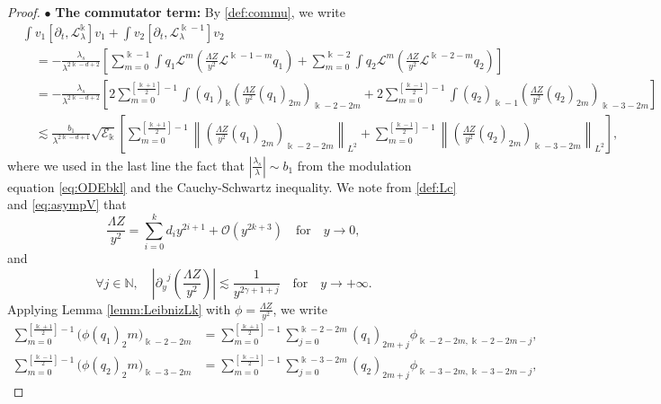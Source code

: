 \documentclass[11pt]{aims}
\theoremstyle{definition}
\numberwithin{equation}{section}
\begin{document}
\begin{proof}
\noindent $\bullet$ \textbf{The commutator term:} By \eqref{def:commu}, we write 
\begin{align*}
&\int v_1 [{\partial_t}, {\mathscr{L}}_\lambda^\Bbbk]v_1 + \int v_2 [{\partial_t}, {\mathscr{L}}_\lambda^{\Bbbk-1}]v_2 \\
&\quad = -\frac{\lambda_s}{\lambda^{2\Bbbk - d + 2}}\left[ \sum_{m = 0}^{\Bbbk - 1}\int q_1 {\mathscr{L}}^m \left(\frac{\Lambda Z}{y^2}{\mathscr{L}}^{\Bbbk - 1 - m}q_1 \right) +\sum_{m = 0}^{\Bbbk - 2}\int q_2 {\mathscr{L}}^m \left(\frac{\Lambda Z}{y^2}{\mathscr{L}}^{\Bbbk - 2 - m}q_2 \right)\right]\\
& \quad = -\frac{\lambda_s}{\lambda^{2\Bbbk - d + 2}} \left[ 2\sum_{m = 0}^{\left[\frac{\Bbbk + 1}{2}\right] - 1}\int (q_1)_\Bbbk \left(\frac{\Lambda Z}{y^2} (q_1)_{2m} \right)_{\Bbbk - 2 - 2m} + 2\sum_{m = 0}^{\left[\frac{\Bbbk - 1}{2}\right] - 1}\int (q_2)_{\Bbbk-1} \left(\frac{\Lambda Z}{y^2} (q_2)_{2m} \right)_{\Bbbk - 3 - 2m} \right]\\
& \quad \lesssim \frac{b_1}{\lambda^{2\Bbbk - d + 1}}\sqrt{{\mathscr{E}}_\Bbbk}\left[\sum_{m = 0}^{\left[\frac{\Bbbk + 1}{2}\right] - 1}\left\|\left(\frac{\Lambda Z}{y^2} (q_1)_{2m} \right)_{\Bbbk - 2 - 2m} \right\|_{L^2} +  \sum_{m = 0}^{\left[\frac{\Bbbk - 1}{2}\right] - 1}\left\|\left(\frac{\Lambda Z}{y^2} (q_2)_{2m} \right)_{\Bbbk - 3 - 2m} \right\|_{L^2}\right],
\end{align*}
where we used in the last line the fact that $\left|\frac{\lambda_s}{\lambda}\right| \sim b_1$ from the modulation equation \eqref{eq:ODEbkl} and the Cauchy-Schwartz inequality. We note from \eqref{def:Lc} and \eqref{eq:asympV} that 
$$\frac{\Lambda Z}{y^2} = \sum_{i = 0}^k d_i y^{2i + 1} + {\mathcal{O}}(y^{2k + 3}) \quad \text{for} \quad y \to 0,$$
and 
$$\forall j \in \mathbb{N},\quad \left|{\partial_y}^j\left(\frac{\Lambda Z}{y^2}\right)\right| \lesssim \frac{1}{ y^{2\gamma + 1 + j}} \quad \text{for} \quad y \to +\infty.$$
Applying Lemma \ref{lemm:LeibnizLk} with $\phi = \frac{\Lambda Z}{y^2}$, we write
\begin{align*}
\sum_{m = 0}^{\left[\frac{\Bbbk + 1}{2}\right] - 1 }\big(\phi (q_1)_2m\big)_{\Bbbk - 2  -2m} &= \sum_{m = 0}^{\left[\frac{\Bbbk + 1}{2}\right] - 1} \sum_{j = 0}^{\Bbbk - 2 - 2m}(q_1)_{2m + j} \phi_{\Bbbk - 2 - 2m, \Bbbk - 2 - 2m - j},\\
\sum_{m = 0}^{\left[\frac{\Bbbk - 1}{2}\right] - 1}\big(\phi (q_2)_2m\big)_{\Bbbk - 3  -2m} &= \sum_{m = 0}^{\left[\frac{\Bbbk - 1}{2}\right] - 1}\sum_{j = 0}^{\Bbbk - 3 - 2m}(q_2)_{2m + j} \phi_{\Bbbk - 3 - 2m, \Bbbk - 3 - 2m - j},

\end{align*}
\end{proof}
\end{document}
